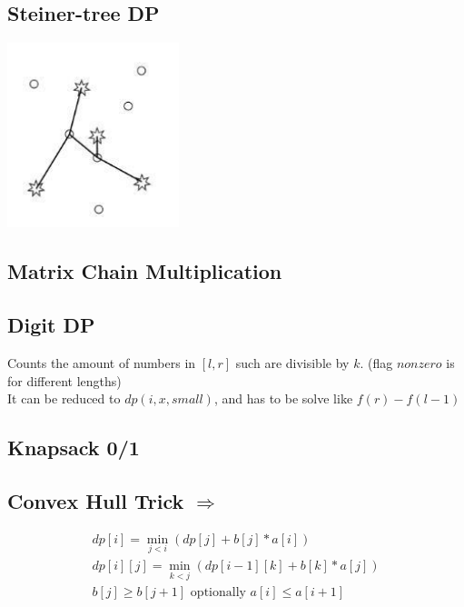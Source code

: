 
\subsection{Steiner-tree DP}
\includegraphics[width = 5cm]{../Codes/DynamicProgramming/SteinerTree.png}
\vspace{-15pt}

\subsection{Matrix Chain Multiplication}

\subsection{Digit DP} 
\vspace{-5pt}
Counts the amount of numbers in $[l, r]$ such are divisible by $k$. (flag $nonzero$ is for different lengths)  \\
It can be reduced to $dp(i, x, small)$, and has to be solve like $f(r) - f(l - 1)$ \\
\vspace{-5pt}
\vspace{-15pt}

\subsection{Knapsack 0/1}

\subsection{Convex Hull Trick  $\Rightarrow$ } 
\vspace{-15pt}
\begin{gather*}
dp[i] = \min_{j < i}(dp[j] + b[j] * a[i]) \\
dp[i][j] = \min_{k < j}(dp[i - 1][k] + b[k] * a[j]) \\
b[j] \geq b[j + 1] \text{ optionally } a[i] \leq a[i + 1] 
\end{gather*}
\vspace{-15pt}
\vspace{-15pt}

